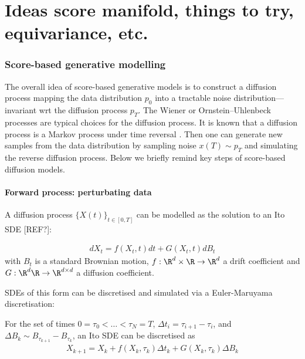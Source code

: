 \part{Ideas score manifold, things to try, equivariance, etc.}

\section{Score-based generative modelling}

The overall idea of score-based generative models is to construct a diffusion process mapping the data distribution $p_0$ into a tractable noise distribution---invariant wrt the diffusion process $p_T$.
The Wiener or Ornstein–Uhlenbeck processes are typical choices for the diffusion process.
It is known that a diffusion process is a Markov process under time reversal \cite{u.g.haussmann1986Time}.
Then one can generate new samples from the data distribution by sampling noise $x(T) \sim p_T$ and simulating the reverse diffusion process.
Below we briefly remind key steps of score-based diffusion models.

\subsection{Forward process: perturbating data}

A diffusion process $\{X(t)\}_{t\in[0,T]}$ can be modelled as the solution to an Ito SDE [REF?]:
\begin{definition}
    \label{def:ito-sde}
    \begin{align}
    dX_t = f(X_t, t) dt + G(X_t, t) dB_t
    \end{align}
    with $B_t$ is a standard Brownian motion, $f: \R^d \times \R \rightarrow \R^d$ a drift coefficient and $G:\R^d \R \rightarrow \R^{d \times d}$ a diffusion coefficient.
\end{definition}
SDEs of this form can be discretised and simulated via a Euler-Maruyama discretisation:
\begin{definition}
For the set of times $0=\tau_0 < \dots < \tau_N = T$, $\Delta t_i = \tau_{i+1} - \tau_{i}$, and $\Delta B_k \sim B_{\tau_{k+1}} - B_{\tau_k}$, an Ito SDE can be discretised as 
\begin{align}
    X_{k+1} = X_k + f(X_k, \tau_k) \Delta t_k + G(X_k, \tau_k) \Delta B_k
\end{align}
\end{definition}

